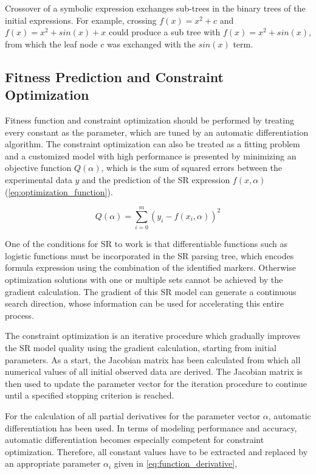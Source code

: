 \documentclass[10pt,journal,compsoc]{IEEEtran}
\begin{document}
Crossover of a symbolic expression exchanges sub-trees in the binary trees of the initial expressions.  For example, crossing $f(x) = x^2+c$ and $f(x) = x^2 + sin(x) +x$ could produce a sub tree with $f(x) = x^2+sin(x)$, from which the leaf node $c$ was exchanged with the $sin(x)$ term.

\subsection{Fitness Prediction and Constraint Optimization}  
Fitness function and constraint optimization should be performed by treating every constant as the parameter, which are tuned by an automatic differentiation algorithm\cite{richard2010AD}. The constraint optimization can also be treated as a fitting problem and a customized model with high performance is presented by minimizing an objective function $Q(\alpha)$, which is the sum of squared errors between the experimental data $y$ and the prediction of the SR expression $f(x,\alpha)$ (\autoref{eq:optimization_function}).

\begin{equation} \label{eq:optimization_function}
Q(\alpha) = \sum_{i=0}^{m}(y_i-f(x_i,\alpha))^2
\end{equation}


One of the conditions for SR to work is that differentiable functions such as logistic functions must be incorporated in the SR parsing tree, which encodes formula expression using the combination of the identified markers. Otherwise optimization solutions with one or multiple sets cannot be achieved by the gradient calculation. The gradient of this SR model can generate a continuous search direction, whose information can be used for accelerating this entire process.

The constraint optimization is an iterative procedure which gradually improves the SR model quality using the gradient calculation, starting from initial parameters. As a start, the Jacobian matrix has been calculated from which all numerical values of all initial observed data are derived. The Jacobian matrix is then used to update the parameter vector for the iteration procedure to continue until a specified stopping criterion is reached.

For the calculation of all partial derivatives for the parameter vector $\alpha$, automatic differentiation has been used. In terms of modeling performance and accuracy, automatic differentiation becomes especially competent for constraint optimization. Therefore, all constant values have to be extracted and replaced by an appropriate parameter $\alpha_i$ given in \autoref{eq:function_derivative},
\end{document}
